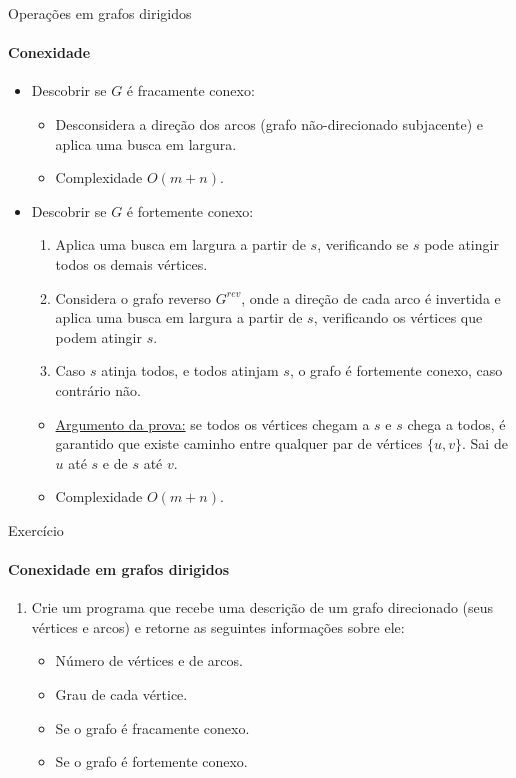\begin{frame}{Operações em grafos dirigidos}
	\framesubtitle{Conexidade}
	
	\begin{itemize}
		\item Descobrir se $G$ é fracamente conexo:
		\begin{itemize}
			\item Desconsidera a direção dos arcos (grafo não-direcionado subjacente) e aplica uma busca em largura.
			\item Complexidade $O(m + n)$.
		\end{itemize}
	
		\item Descobrir se $G$ é fortemente conexo:
		\begin{enumerate}
			\item Aplica uma busca em largura a partir de $s$, verificando se $s$ pode atingir todos os demais vértices.
			\item Considera o grafo reverso $G^{rev}$, onde a direção de cada arco é invertida e aplica uma busca em largura a partir de $s$, verificando os vértices que podem atingir $s$.
			\item Caso $s$ atinja todos, e todos atinjam $s$, o grafo é fortemente conexo, caso contrário não.
		\end{enumerate}
		\begin{itemize}
			\item \underline{Argumento da prova:} se todos os vértices chegam a $s$ e $s$ chega a todos, é garantido que existe caminho entre qualquer par de vértices $\{u, v\}$. Sai de $u$ até $s$ e de $s$ até $v$.
			\item Complexidade $O(m + n)$.
		\end{itemize}
	\end{itemize}
\end{frame}



\begin{frame}{Exercício}
	\framesubtitle{Conexidade em grafos dirigidos}
	
	\begin{enumerate}
		\item Crie um programa que recebe uma descrição de um grafo direcionado (seus vértices e arcos) e retorne as seguintes informações sobre ele:
		\begin{itemize}
			\item Número de vértices e de arcos.
			\item Grau de cada vértice.
			\item Se o grafo é fracamente conexo.
			\item Se o grafo é fortemente conexo.
		\end{itemize}
	\end{enumerate}
\end{frame}



